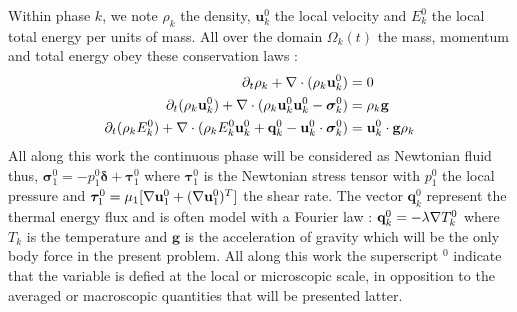 Within phase $k$, we note $\rho_k$ the density, $\textbf{u}_k^0$ the local velocity and $E_k^0$ the local total energy per units of mass.
All over the domain $\Omega_k(t)$ the mass, momentum and total energy obey these conservation laws :
\begin{align}
    \label{eq:dt_rho}
    \partial_t \rho_k  
    + \mathbf{\nabla}\cdot (
        \rho_k\textbf{u}_k^0
    )
    &= 
    0\\
    \label{eq:dt_rhou_k}
    \partial_t (\rho_k\textbf{u}_k^0)  
    + \mathbf{\nabla}\cdot (
        \rho_k\textbf{u}_k^0\textbf{u}_k^0
        - \bm{\sigma}_k^0 
    )
    &= 
    \rho_k \textbf{g}\\
    \label{eq:dt_rhoE_k}
    \partial_t (\rho_kE_k^0)  
    + \mathbf{\nabla}\cdot (
        \rho_kE_k^0\textbf{u}_k^0
        + \textbf{q}_k^0
        - \textbf{u}_k^0 \cdot \bm{\sigma}_k^0 
        )
    &= 
    \textbf{u}_k^0 \cdot \textbf{g}  \rho_k
\end{align} 
All along this work the continuous phase will be considered as Newtonian fluid thus, $\bm{\sigma}_1^0 = - p_1^0 \bm\delta + \bm{\tau}_1^0$ where $\bm{\tau}_1^0$ is the Newtonian stress tensor with $p_1 ^0$ the local pressure and $\bm{\tau}_1^0 = \mu_1[\mathbf{\nabla} \textbf{u}_1^0+(\mathbf{\nabla} \textbf{u}_1^0)^T]$ the shear rate. 
The vector $\textbf{q}_k^0$ represent the thermal energy flux and is often model with a Fourier law : $\textbf{q}_k^0 = -\lambda \mathbf{\nabla} T_k^0$ where $T_k$ is the temperature and $\textbf{g}$ is the acceleration of gravity which will be the only body force in the present problem. 
All along this work the superscript $^0$ indicate that the variable is defied at the local or microscopic scale, in opposition to the averaged or macroscopic quantities that will be presented latter. 

